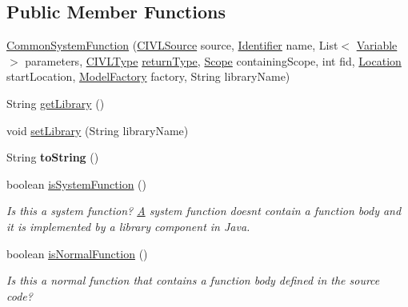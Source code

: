 \subsection*{Public Member Functions}
\begin{DoxyCompactItemize}
\item 
\hyperlink{classedu_1_1udel_1_1cis_1_1vsl_1_1civl_1_1model_1_1common_1_1CommonSystemFunction_ac5bf01df5838550453fe06d32bb71c4b}{Common\+System\+Function} (\hyperlink{interfaceedu_1_1udel_1_1cis_1_1vsl_1_1civl_1_1model_1_1IF_1_1CIVLSource}{C\+I\+V\+L\+Source} source, \hyperlink{interfaceedu_1_1udel_1_1cis_1_1vsl_1_1civl_1_1model_1_1IF_1_1Identifier}{Identifier} name, List$<$ \hyperlink{interfaceedu_1_1udel_1_1cis_1_1vsl_1_1civl_1_1model_1_1IF_1_1variable_1_1Variable}{Variable} $>$ parameters, \hyperlink{interfaceedu_1_1udel_1_1cis_1_1vsl_1_1civl_1_1model_1_1IF_1_1type_1_1CIVLType}{C\+I\+V\+L\+Type} \hyperlink{classedu_1_1udel_1_1cis_1_1vsl_1_1civl_1_1model_1_1common_1_1CommonFunction_a10255f23596c5974e8474769f03a4848}{return\+Type}, \hyperlink{interfaceedu_1_1udel_1_1cis_1_1vsl_1_1civl_1_1model_1_1IF_1_1Scope}{Scope} containing\+Scope, int fid, \hyperlink{interfaceedu_1_1udel_1_1cis_1_1vsl_1_1civl_1_1model_1_1IF_1_1location_1_1Location}{Location} start\+Location, \hyperlink{interfaceedu_1_1udel_1_1cis_1_1vsl_1_1civl_1_1model_1_1IF_1_1ModelFactory}{Model\+Factory} factory, String library\+Name)
\item 
String \hyperlink{classedu_1_1udel_1_1cis_1_1vsl_1_1civl_1_1model_1_1common_1_1CommonSystemFunction_afbb39cf9b9b9fd351d241b21e0580379}{get\+Library} ()
\item 
void \hyperlink{classedu_1_1udel_1_1cis_1_1vsl_1_1civl_1_1model_1_1common_1_1CommonSystemFunction_aa4098b06675a3a17e9e1fa47b9237b4e}{set\+Library} (String library\+Name)
\item 
\hypertarget{classedu_1_1udel_1_1cis_1_1vsl_1_1civl_1_1model_1_1common_1_1CommonSystemFunction_ac36990968b0d0c4fce5f5ff82e28065e}{}String {\bfseries to\+String} ()\label{classedu_1_1udel_1_1cis_1_1vsl_1_1civl_1_1model_1_1common_1_1CommonSystemFunction_ac36990968b0d0c4fce5f5ff82e28065e}

\item 
boolean \hyperlink{classedu_1_1udel_1_1cis_1_1vsl_1_1civl_1_1model_1_1common_1_1CommonSystemFunction_af32cdec342332e97f6ac07b6b2a77b44}{is\+System\+Function} ()
\begin{DoxyCompactList}\small\item\em Is this a system function? \hyperlink{structA}{A} system function doesn\textquotesingle{}t contain a function body and it is implemented by a library component in Java. \end{DoxyCompactList}\item 
boolean \hyperlink{classedu_1_1udel_1_1cis_1_1vsl_1_1civl_1_1model_1_1common_1_1CommonSystemFunction_ae0fd4163ff25ef939a3846513ebb8a10}{is\+Normal\+Function} ()
\begin{DoxyCompactList}\small\item\em Is this a normal function that contains a function body defined in the source code? \end{DoxyCompactList}\end{DoxyCompactItemize}
